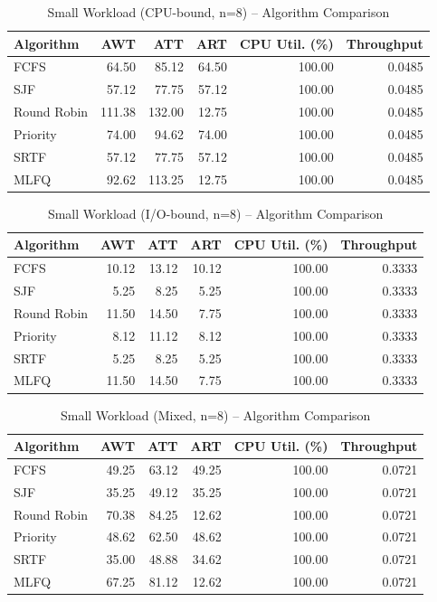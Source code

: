 \begin{table}[H]
\centering
\small
\begin{tabular}{lrrrrr}
\toprule
Algorithm & AWT & ATT & ART & CPU Util. (\%) & Throughput \\
\midrule
FCFS & 64.50 & 85.12 & 64.50 & 100.00 & 0.0485 \\
SJF & 57.12 & 77.75 & 57.12 & 100.00 & 0.0485 \\
Round Robin & 111.38 & 132.00 & 12.75 & 100.00 & 0.0485 \\
Priority & 74.00 & 94.62 & 74.00 & 100.00 & 0.0485 \\
SRTF & 57.12 & 77.75 & 57.12 & 100.00 & 0.0485 \\
MLFQ & 92.62 & 113.25 & 12.75 & 100.00 & 0.0485 \\
\bottomrule
\end{tabular}
\caption{Small Workload (CPU-bound, n=8) -- Algorithm Comparison}
\label{tab:small_cpu_bound}
\end{table}

\begin{table}[H]
\centering
\small
\begin{tabular}{lrrrrr}
\toprule
Algorithm & AWT & ATT & ART & CPU Util. (\%) & Throughput \\
\midrule
FCFS & 10.12 & 13.12 & 10.12 & 100.00 & 0.3333 \\
SJF & 5.25 & 8.25 & 5.25 & 100.00 & 0.3333 \\
Round Robin & 11.50 & 14.50 & 7.75 & 100.00 & 0.3333 \\
Priority & 8.12 & 11.12 & 8.12 & 100.00 & 0.3333 \\
SRTF & 5.25 & 8.25 & 5.25 & 100.00 & 0.3333 \\
MLFQ & 11.50 & 14.50 & 7.75 & 100.00 & 0.3333 \\
\bottomrule
\end{tabular}
\caption{Small Workload (I/O-bound, n=8) -- Algorithm Comparison}
\label{tab:small_io_bound}
\end{table}

\begin{table}[H]
\centering
\small
\begin{tabular}{lrrrrr}
\toprule
Algorithm & AWT & ATT & ART & CPU Util. (\%) & Throughput \\
\midrule
FCFS & 49.25 & 63.12 & 49.25 & 100.00 & 0.0721 \\
SJF & 35.25 & 49.12 & 35.25 & 100.00 & 0.0721 \\
Round Robin & 70.38 & 84.25 & 12.62 & 100.00 & 0.0721 \\
Priority & 48.62 & 62.50 & 48.62 & 100.00 & 0.0721 \\
SRTF & 35.00 & 48.88 & 34.62 & 100.00 & 0.0721 \\
MLFQ & 67.25 & 81.12 & 12.62 & 100.00 & 0.0721 \\
\bottomrule
\end{tabular}
\caption{Small Workload (Mixed, n=8) -- Algorithm Comparison}
\label{tab:small_mixed}
\end{table}

